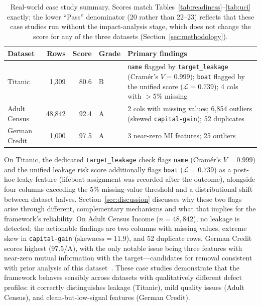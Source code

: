 \documentclass[11pt]{article}
\begin{document}
\begin{table}[!h]
\centering
\caption{Real-world case study summary. Scores match
  Tables~\ref{tab:readiness}--\ref{tab:uci} exactly; the lower ``Pass''
  denominator (20 rather than 22--23) reflects that these case studies run
  without the impact-analysis stage, which does not change the score for
  any of the three datasets (Section~\ref{sec:methodology}).}
\label{tab:casestudies}
\scriptsize
\begin{tabularx}{\columnwidth}{lrrlX}
\toprule
\textbf{Dataset} & \textbf{Rows} & \textbf{Score} & \textbf{Grade} & \textbf{Primary findings} \\
\midrule
Titanic         & 1,309  & 80.6 & B & \texttt{name} flagged by \texttt{target\_leakage} (Cram\'er's $V{=}0.999$); \texttt{boat} flagged by the unified score ($\mathcal{L}{=}0.739$); 4 cols with $>$5\% missing \\
Adult Census    & 48,842 & 92.4 & A & 2 cols with missing values; 6,854 outliers (skewed \texttt{capital-gain}); 52 duplicates \\
German Credit   &  1,000 & 97.5 & A & 3 near-zero MI features; 25 outliers \\
\bottomrule
\end{tabularx}
\end{table}

On Titanic, the dedicated \texttt{target\_leakage} check flags \texttt{name}
(Cram\'er's $V{=}0.999$) and the unified leakage risk score additionally
flags \texttt{boat} ($\mathcal{L}{=}0.739$) as a post-hoc leaky feature
(lifeboat assignment was recorded after the outcome), alongside four
columns exceeding the 5\% missing-value threshold and a distributional
shift between dataset halves.  Section~\ref{sec:discussion} discusses why
these two flags arise through different, complementary mechanisms and what
that implies for the framework's reliability.  On Adult Census Income
($n{=}48{,}842$), no leakage is
detected; the actionable findings are two columns with missing values,
extreme skew in \texttt{capital-gain} ($\text{skewness}{=}11.9$), and 52
duplicate rows.  German Credit scores highest (97.5/A), with the only
notable issue being three features with near-zero mutual information with
the target---candidates for removal consistent with prior analysis of this
dataset~\cite{siddiqi2006credit}.  These case studies demonstrate that the
framework behaves sensibly across datasets with qualitatively different
defect profiles: it correctly distinguishes leakage (Titanic), mild quality
issues (Adult Census), and clean-but-low-signal features (German Credit).
\end{document}
